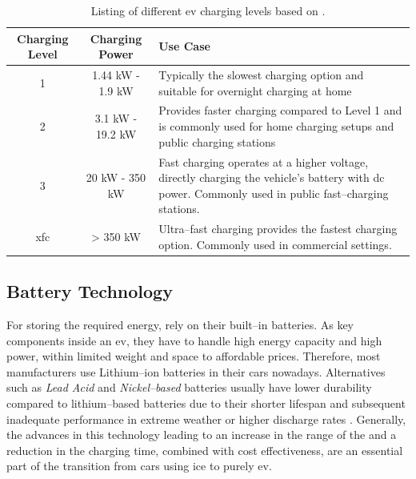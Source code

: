 \begingroup
\setlength{\tabcolsep}{10pt} %
\renewcommand{\arraystretch}{1.5} %
\begin{table}[h]
    \centering
    \caption{Listing of different \acrshort{ev} charging levels based on \cite{acharige_review_2023}.}
    \begin{tabular}{c|c|m{6.5cm}}
        Charging Level & Charging Power & Use Case \\ \hline
         1 & 1.44 \acrshort{kW} - 1.9 \acrshort{kW} & Typically the slowest charging option and suitable for overnight charging at home \\
         2 & 3.1 \acrshort{kW} - 19.2 \acrshort{kW} & Provides faster charging compared to Level 1 and is commonly used for home charging setups and public charging stations \\
         3 & 20 \acrshort{kW} - 350 \acrshort{kW} & Fast charging operates at a higher voltage, directly charging the vehicle's battery with \acrshort{dc} power. Commonly used in public fast--charging stations.\\
         \acrshort{xfc} & > 350 \acrshort{kW} & Ultra--fast charging provides the fastest charging option. Commonly used in commercial settings.
    \end{tabular}
    \label{tab:ev-charging-levels}
\end{table}
\endgroup

\newpage

\subsection{Battery Technology}
\label{ch:Fundamentals:sec:Electric Mobility:ssec:Battery Technology}

For storing the required energy,  rely on their built--in batteries. As key components inside an \acrshort{ev}, they have to handle high energy capacity and high power, within limited weight and space to affordable prices.
Therefore, most manufacturers use Lithium--ion batteries in their cars nowadays. 
Alternatives such as \textit{Lead Acid} and \textit{Nickel--based} batteries usually have lower durability compared to lithium--based batteries due to their shorter lifespan and subsequent inadequate performance in extreme weather or higher discharge rates \cite{acharige_review_2023}.
Generally, the advances in this technology leading to an increase in the range of the  and a reduction in the charging time, combined with cost effectiveness, are an essential part of the transition from cars using \acrshort{ice} to purely \acrshort{ev}.

